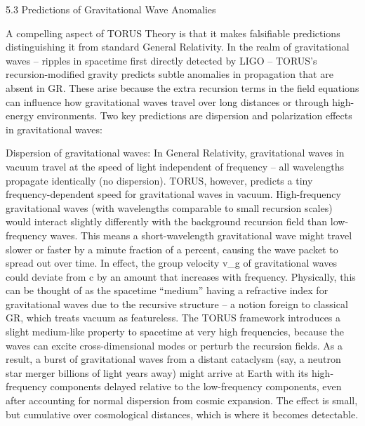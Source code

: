 \documentclass[
]{article}
\begin{document}
5.3 Predictions of Gravitational Wave Anomalies

A compelling aspect of TORUS Theory is that it makes falsifiable
predictions distinguishing it from standard General Relativity. In the
realm of gravitational waves -- ripples in spacetime first directly
detected by LIGO -- TORUS's recursion-modified gravity predicts subtle
anomalies in propagation that are absent in GR. These arise because the
extra recursion terms in the field equations can influence how
gravitational waves travel over long distances or through high-energy
environments. Two key predictions are dispersion and polarization
effects in gravitational waves:

Dispersion of gravitational waves: In General Relativity, gravitational
waves in vacuum travel at the speed of light independent of frequency --
all wavelengths propagate identically (no dispersion). TORUS, however,
predicts a tiny frequency-dependent speed for gravitational waves in
vacuum. High-frequency gravitational waves (with wavelengths comparable
to small recursion scales) would interact slightly differently with the
background recursion field than low-frequency waves. This means a
short-wavelength gravitational wave might travel slower or faster by a
minute fraction of a percent, causing the wave packet to spread out over
time. In effect, the group velocity v\_g of gravitational waves could
deviate from c by an amount that increases with frequency. Physically,
this can be thought of as the spacetime ``medium'' having a refractive
index for gravitational waves due to the recursive structure -- a notion
foreign to classical GR, which treats vacuum as featureless. The TORUS
framework introduces a slight medium-like property to spacetime at very
high frequencies, because the waves can excite cross-dimensional modes
or perturb the recursion fields. As a result, a burst of gravitational
waves from a distant cataclysm (say, a neutron star merger billions of
light years away) might arrive at Earth with its high-frequency
components delayed relative to the low-frequency components, even after
accounting for normal dispersion from cosmic expansion. The effect is
small, but cumulative over cosmological distances, which is where it
becomes detectable.
\end{document}
